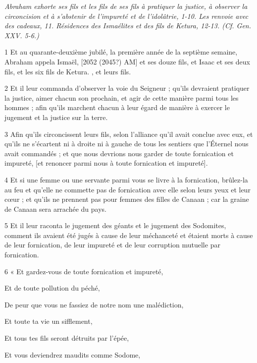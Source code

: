 \par \textit{Abraham exhorte ses fils et les fils de ses fils à pratiquer la justice, à observer la circoncision et à s'abstenir de l'impureté et de l'idolâtrie, 1-10. Les renvoie avec des cadeaux, 11. Résidences des Ismaélites et des fils de Ketura, 12-13. (Cf. Gen. XXV. 5-6.)}

\par 1 Et au quarante-deuxième jubilé, la première année de la septième semaine, Abraham appela Ismaël, [2052 (2045?) AM] et ses douze fils, et Isaac et ses deux fils, et les six fils de Ketura. , et leurs fils.
\par 2 Et il leur commanda d'observer la voie du Seigneur ; qu'ils devraient pratiquer la justice, aimer chacun son prochain, et agir de cette manière parmi tous les hommes ; afin qu'ils marchent chacun à leur égard de manière à exercer le jugement et la justice sur la terre.
\par 3 Afin qu'ils circoncissent leurs fils, selon l'alliance qu'il avait conclue avec eux, et qu'ils ne s'écartent ni à droite ni à gauche de tous les sentiers que l'Éternel nous avait commandés ; et que nous devrions nous garder de toute fornication et impureté, [et renoncer parmi nous à toute fornication et impureté].
\par 4 Et si une femme ou une servante parmi vous se livre à la fornication, brûlez-la au feu et qu'elle ne commette pas de fornication avec elle selon leurs yeux et leur cœur ; et qu'ils ne prennent pas pour femmes des filles de Canaan ; car la graine de Canaan sera arrachée du pays.
\par 5 Et il leur raconta le jugement des géants et le jugement des Sodomites, comment ils avaient été jugés à cause de leur méchanceté et étaient morts à cause de leur fornication, de leur impureté et de leur corruption mutuelle par fornication.
\par    
\par 6 « Et gardez-vous de toute fornication et impureté,  
\par     Et de toute pollution du péché,
\par    
\par     De peur que vous ne fassiez de notre nom une malédiction,  
\par     Et toute ta vie un sifflement,
\par    
\par     Et tous tes fils seront détruits par l'épée,  
\par     Et vous deviendrez maudits comme Sodome,  
